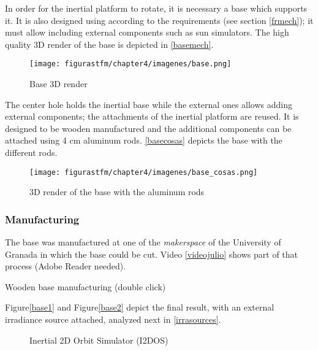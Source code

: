 In order for the inertial platform to rotate, it is necessary a base which supports it. It is also designed using  according to the requirements (see section \ref{frmech}); it must allow including external components such as sun simulators. The high quality 3D render of the base is depicted in \autoref{basemech}.

\begin{figure}[H]
			\centering
			\texttt{[image: figurastfm/chapter4/imagenes/base.png]}
			\caption{Base 3D render} \label{basemech} 
\end{figure}

The center hole holds the inertial base while the external ones allows adding external components; the attachments of the inertial platform are reused. It is designed to be wooden manufactured and the additional components can be attached using 4 cm aluminum rods. \autoref{basecosas} depicts the base with the different rods.

\begin{figure}[H]
			\centering
			\texttt{[image: figurastfm/chapter4/imagenes/base\_cosas.png]}
			\caption{3D render of the base with the aluminum rods} \label{basecosas} 
\end{figure}
\subsubsection{Manufacturing}

The base was manufactured at one of the \textit{makerspace} of the University of Granada in which the base could be cut. Video \autoref{videojulio} shows part of that process (Adobe Reader needed).


\begin{videoFloat}[H]
\centering
{}
\caption{Wooden base manufacturing (double click)} \label{videojulio}
\vspace{-0.5cm}
\end{videoFloat}

Figure\autoref{base1} and Figure\autoref{base2} depict the final result, with an external irradiance source attached, analyzed next in \autoref{irrasources}. 


			\begin{figure}[H]
			\centering
			 \quad
			\caption{Inertial 2D Orbit Simulator (I2DOS)} \label{i2dosfinal}
			\vspace{-0.5cm}
\end{figure}

